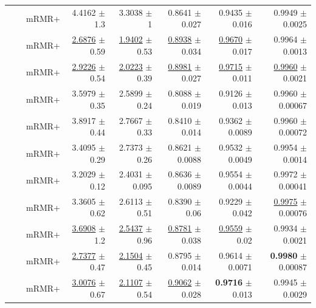 \begin{longtable}{llp{}rrrrr}
 &  & mRMR+ & 4.4162 {\scriptsize $\pm$ 1.3} & 3.3038 {\scriptsize $\pm$ 1} & 0.8641 {\scriptsize $\pm$ 0.027} & 0.9435 {\scriptsize $\pm$ 0.016} & 0.9949 {\scriptsize $\pm$ 0.0025} \\
 &  & mRMR+ & \underline{2.6876} {\scriptsize $\pm$ 0.59} & \underline{1.9402} {\scriptsize $\pm$ 0.53} & \underline{0.8938} {\scriptsize $\pm$ 0.034} & \underline{0.9670} {\scriptsize $\pm$ 0.017} & 0.9964 {\scriptsize $\pm$ 0.0013} \\
 &  & mRMR+ & \underline{2.9226} {\scriptsize $\pm$ 0.54} & \underline{2.0223} {\scriptsize $\pm$ 0.39} & \underline{0.8981} {\scriptsize $\pm$ 0.027} & \underline{0.9715} {\scriptsize $\pm$ 0.011} & \underline{0.9960} {\scriptsize $\pm$ 0.0021} \\
 &  & mRMR+ & 3.5979 {\scriptsize $\pm$ 0.35} & 2.5899 {\scriptsize $\pm$ 0.24} & 0.8088 {\scriptsize $\pm$ 0.019} & 0.9126 {\scriptsize $\pm$ 0.013} & 0.9960 {\scriptsize $\pm$ 0.00067} \\
 &  & mRMR+ & 3.8917 {\scriptsize $\pm$ 0.44} & 2.7667 {\scriptsize $\pm$ 0.33} & 0.8410 {\scriptsize $\pm$ 0.014} & 0.9362 {\scriptsize $\pm$ 0.0089} & 0.9960 {\scriptsize $\pm$ 0.00072} \\
 &  & mRMR+ & 3.4095 {\scriptsize $\pm$ 0.29} & 2.7373 {\scriptsize $\pm$ 0.26} & 0.8621 {\scriptsize $\pm$ 0.0088} & 0.9532 {\scriptsize $\pm$ 0.0049} & 0.9954 {\scriptsize $\pm$ 0.0014} \\
 &  & mRMR+ & 3.2029 {\scriptsize $\pm$ 0.12} & 2.4031 {\scriptsize $\pm$ 0.095} & 0.8636 {\scriptsize $\pm$ 0.0089} & 0.9554 {\scriptsize $\pm$ 0.0044} & 0.9972 {\scriptsize $\pm$ 0.00041} \\
 &  & mRMR+ & 3.3605 {\scriptsize $\pm$ 0.62} & 2.6113 {\scriptsize $\pm$ 0.51} & 0.8390 {\scriptsize $\pm$ 0.06} & 0.9229 {\scriptsize $\pm$ 0.042} & \underline{0.9975} {\scriptsize $\pm$ 0.00076} \\
 &  & mRMR+ & \underline{3.6908} {\scriptsize $\pm$ 1.2} & \underline{2.5437} {\scriptsize $\pm$ 0.96} & \underline{0.8781} {\scriptsize $\pm$ 0.038} & \underline{0.9559} {\scriptsize $\pm$ 0.02} & 0.9934 {\scriptsize $\pm$ 0.0021} \\
 &  & mRMR+ & \underline{2.7377} {\scriptsize $\pm$ 0.47} & \underline{2.1504} {\scriptsize $\pm$ 0.45} & 0.8795 {\scriptsize $\pm$ 0.014} & 0.9614 {\scriptsize $\pm$ 0.0071} & \textbf{0.9980} {\scriptsize $\pm$ 0.00087} \\
 &  & mRMR+ & \underline{3.0076} {\scriptsize $\pm$ 0.67} & \underline{2.1107} {\scriptsize $\pm$ 0.54} & \underline{0.9062} {\scriptsize $\pm$ 0.028} & \textbf{0.9716} {\scriptsize $\pm$ 0.013} & 0.9945 {\scriptsize $\pm$ 0.0029} \\

\end{longtable}
